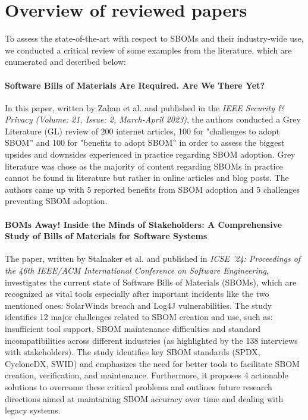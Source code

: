 \section{Overview of reviewed papers}

To assess the state-of-the-art with respect to SBOMs and their industry-wide use, we conducted a critical review of some examples from the literature, which are enumerated and described below:

\paragraph{Software Bills of Materials Are Required. Are We There Yet?} \cite{article:sbom-required} In this paper, written by Zahan et al. and published in the \emph{IEEE Security \& Privacy (Volume: 21, Issue: 2, March-April 2023)}, the authors conducted a Grey Literature (GL) review of 200 internet articles, 100 for "challenges to adopt SBOM” and 100 for "benefits to adopt SBOM” in order to assess the biggest upsides and downsides experienced in practice regarding SBOM adoption. Grey literature was chose as the majority of content regarding SBOMs in practice cannot be found in literature but rather in online articles and blog posts. The authors came up with 5 reported benefits from SBOM adoption and 5 challenges preventing SBOM adoption.

\paragraph{BOMs Away! Inside the Minds of Stakeholders: A Comprehensive Study of Bills of Materials for Software Systems} \cite{article:software-bom} The paper, written by Stalnaker et al. and published in \emph{ICSE '24: Proceedings of the 46th IEEE/ACM International Conference on Software Engineering}, investigates the current state of Software Bills of Materials (SBOMs), which are recognized as vital tools especially after important incidents like the two mentioned ones: SolarWinds breach and Log4J vulnerabilities. The study identifies 12 major challenges related to SBOM creation and use, such as: insufficient tool support, SBOM maintenance difficulties and standard incompatibilities across different industries (as highlighted by the 138 interviews with stakeholders).
The study identifies key SBOM standards (SPDX, CycloneDX, SWID) and emphasizes the need for better tools to facilitate SBOM creation, verification, and maintenance. Furthermore, it proposes 4 actionable solutions to overcome these critical problems and outlines future research directions aimed at maintaining SBOM accuracy over time and dealing with legacy systems.

